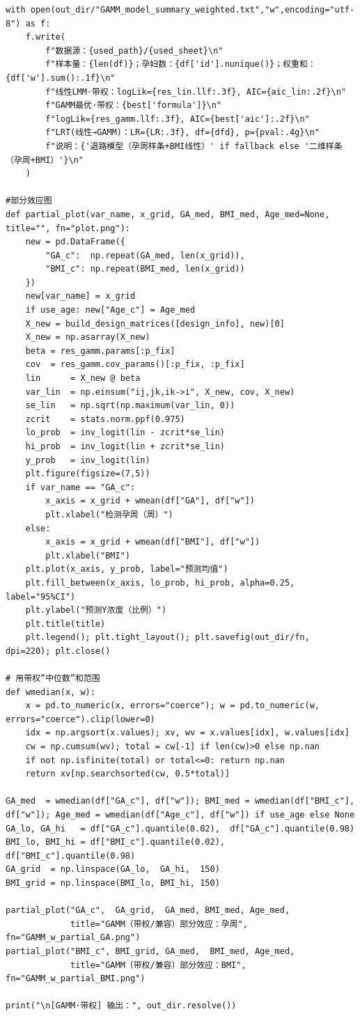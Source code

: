 \begin{lstlisting}
with open(out_dir/"GAMM_model_summary_weighted.txt","w",encoding="utf-8") as f:
    f.write(
        f"数据源：{used_path}/{used_sheet}\n"
        f"样本量：{len(df)}；孕妇数：{df['id'].nunique()}；权重和：{df['w'].sum():.1f}\n"
        f"线性LMM·带权：logLik={res_lin.llf:.3f}, AIC={aic_lin:.2f}\n"
        f"GAMM最优·带权：{best['formula']}\n"
        f"logLik={res_gamm.llf:.3f}, AIC={best['aic']:.2f}\n"
        f"LRT(线性→GAMM)：LR={LR:.3f}, df={dfd}, p={pval:.4g}\n"
        f"说明：{'退路模型（孕周样条+BMI线性）' if fallback else '二维样条（孕周+BMI）'}\n"
    )

#部分效应图
def partial_plot(var_name, x_grid, GA_med, BMI_med, Age_med=None, title="", fn="plot.png"):
    new = pd.DataFrame({
        "GA_c":  np.repeat(GA_med, len(x_grid)),
        "BMI_c": np.repeat(BMI_med, len(x_grid))
    })
    new[var_name] = x_grid
    if use_age: new["Age_c"] = Age_med
    X_new = build_design_matrices([design_info], new)[0]
    X_new = np.asarray(X_new)
    beta = res_gamm.params[:p_fix]
    cov  = res_gamm.cov_params()[:p_fix, :p_fix]
    lin      = X_new @ beta
    var_lin  = np.einsum("ij,jk,ik->i", X_new, cov, X_new)
    se_lin   = np.sqrt(np.maximum(var_lin, 0))
    zcrit    = stats.norm.ppf(0.975)
    lo_prob  = inv_logit(lin - zcrit*se_lin)
    hi_prob  = inv_logit(lin + zcrit*se_lin)
    y_prob   = inv_logit(lin)
    plt.figure(figsize=(7,5))
    if var_name == "GA_c":
        x_axis = x_grid + wmean(df["GA"], df["w"])
        plt.xlabel("检测孕周（周）")
    else:
        x_axis = x_grid + wmean(df["BMI"], df["w"])
        plt.xlabel("BMI")
    plt.plot(x_axis, y_prob, label="预测均值")
    plt.fill_between(x_axis, lo_prob, hi_prob, alpha=0.25, label="95%CI")
    plt.ylabel("预测Y浓度（比例）")
    plt.title(title)
    plt.legend(); plt.tight_layout(); plt.savefig(out_dir/fn, dpi=220); plt.close()

# 用带权“中位数”和范围
def wmedian(x, w):
    x = pd.to_numeric(x, errors="coerce"); w = pd.to_numeric(w, errors="coerce").clip(lower=0)
    idx = np.argsort(x.values); xv, wv = x.values[idx], w.values[idx]
    cw = np.cumsum(wv); total = cw[-1] if len(cw)>0 else np.nan
    if not np.isfinite(total) or total<=0: return np.nan
    return xv[np.searchsorted(cw, 0.5*total)]

GA_med  = wmedian(df["GA_c"], df["w"]); BMI_med = wmedian(df["BMI_c"], df["w"]); Age_med = wmedian(df["Age_c"], df["w"]) if use_age else None
GA_lo, GA_hi   = df["GA_c"].quantile(0.02),  df["GA_c"].quantile(0.98)
BMI_lo, BMI_hi = df["BMI_c"].quantile(0.02), df["BMI_c"].quantile(0.98)
GA_grid  = np.linspace(GA_lo,  GA_hi,  150)
BMI_grid = np.linspace(BMI_lo, BMI_hi, 150)

partial_plot("GA_c",  GA_grid,  GA_med, BMI_med, Age_med,
             title="GAMM（带权/兼容）部分效应：孕周", fn="GAMM_w_partial_GA.png")
partial_plot("BMI_c", BMI_grid, GA_med,  BMI_med, Age_med,
             title="GAMM（带权/兼容）部分效应：BMI", fn="GAMM_w_partial_BMI.png")

print("\n[GAMM·带权] 输出：", out_dir.resolve())


\end{lstlisting}
